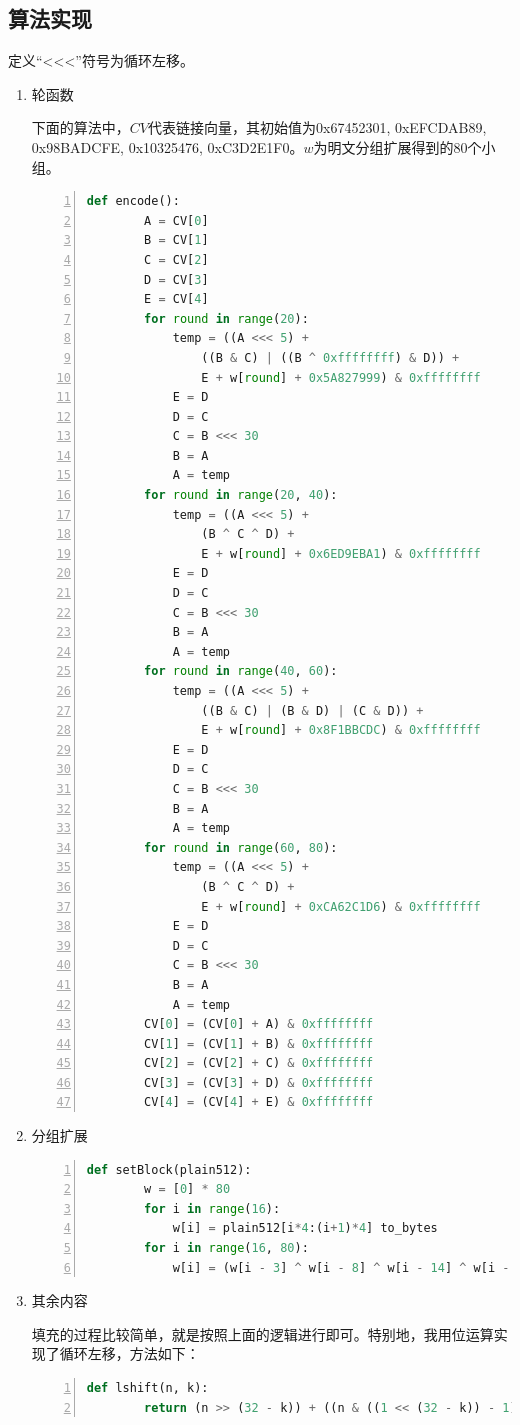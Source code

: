 \documentclass[11pt]{ctexart}
\begin{document}
\subsection{算法实现} %
定义“<<<”符号为循环左移。
\begin{enumerate}
    \item 轮函数

    下面的算法中，$CV$代表链接向量，其初始值为0x67452301, 0xEFCDAB89, 0x98BADCFE, 0x10325476, 0xC3D2E1F0。$w$为明文分组扩展得到的80个小组。
    \begin{lstlisting}[language={python},
    numbers=left,
    numberstyle=\tiny\monaco,
    basicstyle=\small\monaco]
    def encode():
        A = CV[0]
        B = CV[1]
        C = CV[2]
        D = CV[3]
        E = CV[4]
        for round in range(20):
            temp = ((A <<< 5) + 
                ((B & C) | ((B ^ 0xffffffff) & D)) + 
                E + w[round] + 0x5A827999) & 0xffffffff
            E = D
            D = C
            C = B <<< 30
            B = A
            A = temp
        for round in range(20, 40):
            temp = ((A <<< 5) + 
                (B ^ C ^ D) + 
                E + w[round] + 0x6ED9EBA1) & 0xffffffff
            E = D
            D = C
            C = B <<< 30
            B = A
            A = temp
        for round in range(40, 60):
            temp = ((A <<< 5) + 
                ((B & C) | (B & D) | (C & D)) + 
                E + w[round] + 0x8F1BBCDC) & 0xffffffff
            E = D
            D = C
            C = B <<< 30
            B = A
            A = temp
        for round in range(60, 80):
            temp = ((A <<< 5) + 
                (B ^ C ^ D) + 
                E + w[round] + 0xCA62C1D6) & 0xffffffff
            E = D
            D = C
            C = B <<< 30
            B = A
            A = temp
        CV[0] = (CV[0] + A) & 0xffffffff
        CV[1] = (CV[1] + B) & 0xffffffff
        CV[2] = (CV[2] + C) & 0xffffffff
        CV[3] = (CV[3] + D) & 0xffffffff
        CV[4] = (CV[4] + E) & 0xffffffff
    \end{lstlisting}
    \item 分组扩展

    \begin{lstlisting}[language={python},
    numbers=left,
    numberstyle=\tiny\monaco,
    basicstyle=\small\monaco]
    def setBlock(plain512):
        w = [0] * 80
        for i in range(16):
            w[i] = plain512[i*4:(i+1)*4] to_bytes
        for i in range(16, 80):
            w[i] = (w[i - 3] ^ w[i - 8] ^ w[i - 14] ^ w[i - 16]) <<< 1
    \end{lstlisting}

    \item 其余内容

    填充的过程比较简单，就是按照上面的逻辑进行即可。特别地，我用位运算实现了循环左移，方法如下：
    \begin{lstlisting}[language={python},
    numbers=left,
    numberstyle=\tiny\monaco,
    basicstyle=\small\monaco]
    def lshift(n, k):
        return (n >> (32 - k)) + ((n & ((1 << (32 - k)) - 1)) << k)
    \end{lstlisting}
\end{enumerate}
\end{document}
